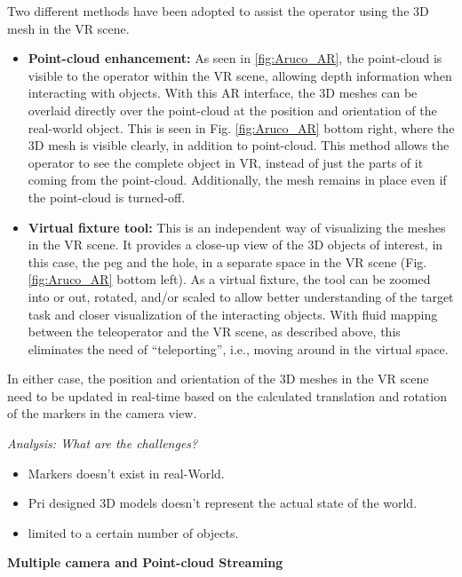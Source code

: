 Two different methods have been adopted to assist the operator using the 3D mesh in the VR scene.

\begin{itemize}
    \item \textbf{Point-cloud  enhancement:}  As  seen  in \ref{fig:Aruco_AR},  the  point-cloud  is  visible  to  the  operator  within the VR scene, allowing depth information when interacting with objects. With this AR interface,  the  3D  meshes  can  be  overlaid  directly  over  the  point-cloud at  the  position  and  orientation  of  the  real-world  object.  This  is  seen  in  Fig. \ref{fig:Aruco_AR} bottom right,  where  the  3D  mesh  is  visible  clearly, in addition to point-cloud. This method allows the operator to see the complete object in  VR,  instead  of  just  the  parts  of  it  coming  from  the  point-cloud.  Additionally,  the  mesh  remains in place even if the point-cloud is turned-off.
    
    \item \textbf{Virtual fixture tool:} This is an independent way of visualizing the meshes in the VR scene. It provides a close-up view of the 3D objects of interest, in   this case, the peg and the hole, in a separate space in the VR scene (Fig. \ref{fig:Aruco_AR} bottom left). As a virtual fixture, the tool can be zoomed into or out,  rotated,  and/or  scaled  to  allow  better  understanding  of  the  target  task  and  closer  visualization of the interacting objects. With fluid mapping between the teleoperator and the VR scene, as described above, this eliminates the need of “teleporting”, i.e., moving around in the virtual space.
    
\end{itemize}

In either case, the position and orientation of the 3D meshes in the VR scene need to be updated in real-time based on the calculated translation and rotation of the markers in the camera view.

\textit{Analysis: What are the challenges?}
\begin{itemize}
    \item Markers doesn't exist in real-World.
    \item Pri designed 3D models doesn't represent the actual state of the world.
    \item limited to a certain number of objects.
\end{itemize}


\textbf{Multiple camera and Point-cloud Streaming}

